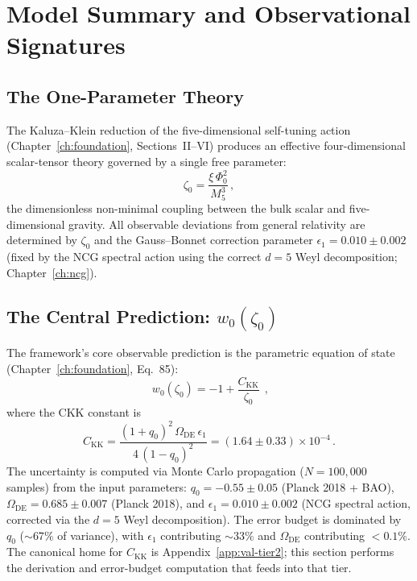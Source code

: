 \section{Model Summary and Observational Signatures}
\label{sec:2-model}

\subsection{The One-Parameter Theory}
\label{sec:2-one-param}

The Kaluza--Klein reduction of the five-dimensional self-tuning action (Chapter~\ref{ch:foundation}, Sections~II--VI) produces an effective four-dimensional scalar-tensor theory governed by a single free parameter:
\begin{equation}
\zeta_0 = \frac{\xi\,\Phi_0^2}{M_5^3}\,,
\label{eq:2-zeta0}
\end{equation}
the dimensionless non-minimal coupling between the bulk scalar and five-dimensional gravity. All observable deviations from general relativity are determined by $\zeta_0$ and the Gauss--Bonnet correction parameter $\epsilon_1 = 0.010 \pm 0.002$ (fixed by the NCG spectral action using the correct $d = 5$ Weyl decomposition; Chapter~\ref{ch:ncg}).

\subsection{The Central Prediction: $w_0(\zeta_0)$}
\label{sec:2-w0curve}

The framework's core observable prediction is the parametric equation of state (Chapter~\ref{ch:foundation}, Eq.~85):
\begin{equation}
\boxed{\;w_0(\zeta_0) = -1 + \frac{C_\mathrm{KK}}{\zeta_0}\;}\,,
\label{eq:2-w0-parametric}
\end{equation}
where the CKK constant is
\begin{equation}
C_\mathrm{KK} = \frac{(1+q_0)^2\,\Omega_\mathrm{DE}\,\epsilon_1}{4\,(1-q_0)^2} = (1.64 \pm 0.33) \times 10^{-4}\,.
\label{eq:2-CKK}
\end{equation}
The uncertainty is computed via Monte Carlo propagation ($N = 100{,}000$ samples) from the input parameters: $q_0 = -0.55 \pm 0.05$ (Planck 2018 + BAO), $\Omega_\mathrm{DE} = 0.685 \pm 0.007$ (Planck 2018), and $\epsilon_1 = 0.010 \pm 0.002$ (NCG spectral action, corrected via the $d = 5$ Weyl decomposition). The error budget is dominated by $q_0$ (${\sim}67\%$ of variance), with $\epsilon_1$ contributing ${\sim}33\%$ and $\Omega_\mathrm{DE}$ contributing $< 0.1\%$. The canonical home for $C_\mathrm{KK}$ is Appendix~\ref{app:val-tier2}; this section performs the derivation and error-budget computation that feeds into that tier.

